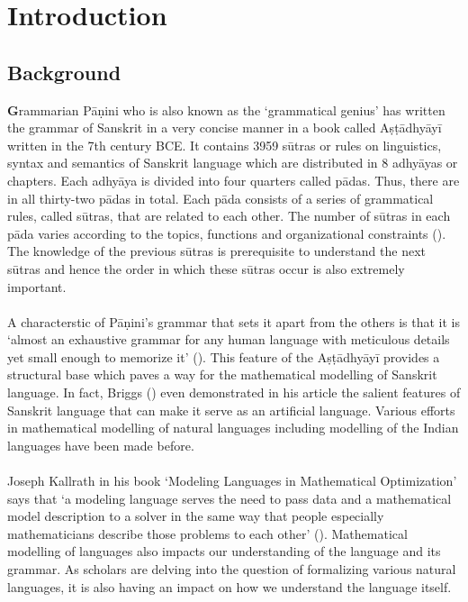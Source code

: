 \chapter{Introduction}
\section{Background}

\label{sec:background}

\lettrine[findent=2pt]{\textbf{G}}{}rammarian Pāṇini who is also known as the ‘grammatical genius’ has written the grammar of Sanskrit in a very concise manner in a book called Aṣṭādhyāyī written in the 7th century BCE. It contains 3959 sūtras or rules on linguistics, syntax and semantics of Sanskrit language which are distributed in 8 adhyāyas or chapters. Each adhyāya is divided into four quarters called pādas. Thus, there are in all thirty-two pādas in total.  Each pāda consists of a series of grammatical rules, called sūtras, that are related to each other. The number of sūtras in each pāda varies according to the topics, functions and organizational constraints (\cite{Sreenivas}). The knowledge of the previous sūtras is prerequisite to understand the next sūtras and hence the order in which these sūtras occur is also extremely important. \\\\
A characterstic of Pāṇini’s grammar that sets it apart from the others is that it is ‘almost an exhaustive grammar for any human language with meticulous details yet small enough to memorize it’ (\cite{brevity}). This feature of the Aṣṭādhyāyī provides a structural base which paves a way for the mathematical modelling of Sanskrit language. In fact, Briggs (\cite{Briggs_1985}) even demonstrated in his article the salient features of Sanskrit language that can make it serve as an artificial language. Various efforts in mathematical modelling of natural languages including modelling of the Indian languages have been made before. \\\\
Joseph Kallrath in his book ‘Modeling Languages in Mathematical Optimization’ says that ‘a modeling language serves the need to pass data and a mathematical model description to a solver in the same way that people especially mathematicians describe those problems to each other’ (\cite{kallrath}). Mathematical modelling of languages also impacts our understanding of the language and its grammar. As scholars are delving into the question of formalizing various natural languages, it is also having an impact on how we understand the language itself.\\\\
